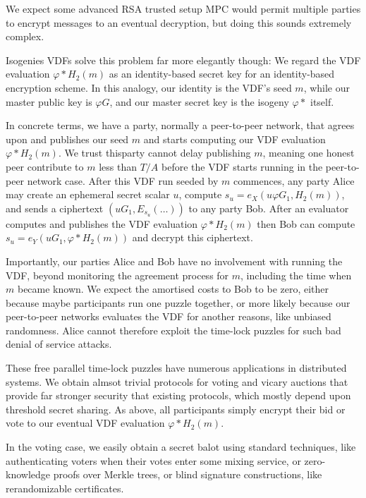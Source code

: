 \documentclass{article}
\begin{document}
We expect some advanced RSA trusted setup MPC would permit multiple
parties to encrypt messages to an eventual decryption, but doing this
sounds extremely complex.

Isogenies VDFs solve this problem far more elegantly though:
We regard the VDF evaluation $φ* H_2(m)$ as an identity-based secret
key for an identity-based encryption scheme.  In this analogy, our
identity is the VDF's seed $m$, while our master public key is $φ G$,
and our master secret key is the isogeny $φ*$ itself.

In concrete terms, we have a party, normally a peer-to-peer network,
that agrees upon and publishes our seed $m$ and starts computing our
VDF evaluation $φ* H_2(m)$.  We trust thisparty cannot delay publishing
$m$, meaning one honest peer contribute to $m$ less than $T/A$ before
the VDF starts running in the peer-to-peer network case.
After this VDF run seeded by $m$ commences, any party Alice may create
an ephemeral secret scalar $u$, compute $s_u = e_X ( u φ G_1, H_2(m) )$,
and sends a ciphertext $(u G_1, E_{s_u}(\ldots))$ to any party Bob.
After an evaluator computes and publishes the VDF evaluation
$φ* H_2(m)$ then Bob can compute $s_u = e_Y ( u G_1, φ* H_2(m) )$ and
decrypt this ciphertext.

Importantly, our parties Alice and Bob have no involvement with
running the VDF, beyond monitoring the agreement process for $m$,
including the time when $m$ became known.  We expect the amortised
costs to Bob to be zero, either because maybe participants run one
puzzle together, or more likely because our peer-to-peer networks
evaluates the VDF for another reasons, like unbiased randomness.
Alice cannot therefore exploit the time-lock puzzles for such bad
denial of service attacks.

These free parallel time-lock puzzles have numerous applications in
distributed systems.  We obtain almsot trivial protocols for voting
and vicary auctions that provide far stronger security that existing
protocols, which mostly depend upon threshold secret sharing.
As above, all participants simply encrypt their bid or vote to our
eventual VDF evaluation $φ* H_2(m)$.  

In the voting case, we easily obtain a secret balot using standard
techniques, like authenticating voters when their votes enter some
mixing service, or zero-knowledge proofs over Merkle trees, or
blind signature constructions, like rerandomizable certificates.

\end{document}
